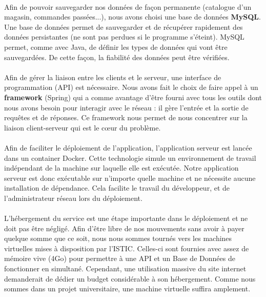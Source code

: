 \documentclass[a4paper, 12pt]{article}
\begin{document}
\paragraph{}Afin de pouvoir sauvegarder nos données de façon permanente (catalogue d’un magasin, commandes passées...), nous avons choisi une base de données \textbf{MySQL}. Une base de données permet de sauvegarder et de récupérer rapidement des données persistantes (ne sont pas perdues si le programme s'éteint).  MySQL permet, comme avec Java, de définir les types de données qui vont être sauvegardées. De cette façon, la fiabilité des données peut être vérifiées.

\paragraph{}Afin de gérer la liaison entre les clients et le serveur, une interface de programmation (API) est nécessaire. Nous avons fait le choix de faire appel à un \textbf{framework} (Spring) qui a comme avantage d’être fourni avec tous les outils dont nous avons besoin pour interagir avec le réseau : il gère l'entrée et la sortie de requêtes et de réponses. Ce framework nous permet de nous concentrer sur la liaison client-serveur qui est le cœur du problème.

\paragraph{}Afin de faciliter le déploiement de l’application, l’application serveur est lancée dans un container Docker. Cette technologie simule un environnement de travail indépendant de la machine sur laquelle elle est exécutée. Notre application serveur est donc exécutable sur n’importe quelle machine et ne nécessite aucune installation de dépendance. Cela facilite le travail du développeur, et de l’administrateur réseau lors du déploiement.

\paragraph{}L’hébergement du service est une étape importante dans le déploiement et ne doit pas être négligé. Afin d’être libre de nos mouvements sans avoir à payer quelque somme que ce soit, nous nous sommes tournés vers les machines virtuelles mises à disposition par l’ISTIC. Celles-ci sont fournies avec assez de mémoire vive (4Go) pour permettre à une API et un Base de Données de fonctionner en simultané. Cependant, une utilisation massive du site internet demanderait de dédier un budget considérable à son hébergement. Comme nous sommes dans un projet universitaire, une machine virtuelle suffira amplement.
\end{document}
